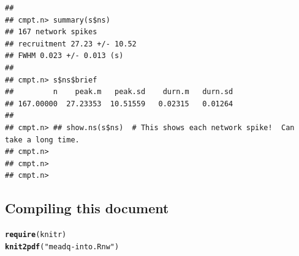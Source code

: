 \documentclass{article}\usepackage[]{graphicx}\usepackage[]{color}
\makeatletter
\newcommand{\hlstr}[1]{\textcolor[rgb]{0.192,0.494,0.8}{#1}}%
\newcommand{\hlstd}[1]{\textcolor[rgb]{0.345,0.345,0.345}{#1}}%
\newcommand{\hlkwd}[1]{\textcolor[rgb]{0.737,0.353,0.396}{\textbf{#1}}}%
\newenvironment{kframe}{%
 \def\at@end@of@kframe{}%
 \ifinner\ifhmode%
  \def\at@end@of@kframe{\end{minipage}}%
  \begin{minipage}{\columnwidth}%
 \fi\fi%
 \def\FrameCommand##1{\hskip\@totalleftmargin \hskip-\fboxsep
 \colorbox{shadecolor}{##1}\hskip-\fboxsep
     \hskip-\linewidth \hskip-\@totalleftmargin \hskip\columnwidth}%
 \MakeFramed {\advance\hsize-\width
   \@totalleftmargin\z@ \linewidth\hsize
   \@setminipage}}%
 {\par\unskip\endMakeFramed%
 \at@end@of@kframe}
\newenvironment{knitrout}{}{} %
\makeatother
\begin{document}
\begin{knitrout}
\begin{kframe}\begin{verbatim}
## 
## cmpt.n> summary(s$ns)
## 167 network spikes
## recruitment 27.23 +/- 10.52
## FWHM 0.023 +/- 0.013 (s)
## 
## cmpt.n> s$ns$brief
##         n    peak.m   peak.sd    durn.m   durn.sd 
## 167.00000  27.23353  10.51559   0.02315   0.01264 
## 
## cmpt.n> ## show.ns(s$ns)  # This shows each network spike!  Can take a long time.
## cmpt.n> 
## cmpt.n> 
## cmpt.n>
\end{verbatim}
\end{kframe}
\end{knitrout}





\subsection*{Compiling this document}

\begin{knitrout}
\color{fgcolor}\begin{kframe}
\begin{alltt}
\hlkwd{require}\hlstd{(knitr)}
\hlkwd{knit2pdf}\hlstd{(}\hlstr{"meadq-into.Rnw"}\hlstd{)}
\end{alltt}
\end{kframe}
\end{knitrout}
\end{document}

